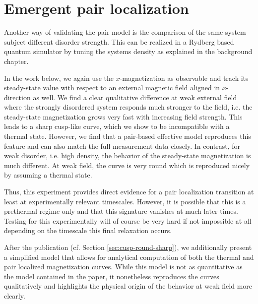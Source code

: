 

\section{Emergent pair localization}
Another way of validating the pair model is the comparison of the same system subject different disorder strength. This can be realized in a Rydberg based quantum simulator by tuning the systems density as explained in the background chapter. %

In the work below, we again use the $x$-magnetization as observable and track its steady-state value with respect to an external magnetic field aligned in $x$-direction as well. We find a clear qualitative difference at weak external field where the strongly disordered system responds much stronger to the field, i.e. the steady-state magnetization grows very fast with increasing field strength. This leads to a sharp cusp-like curve, which we show to be incompatible with a thermal state. However, we find that a pair-based effective model reproduces this feature and can also match the full measurement data closely.
In contrast, for weak disorder, i.e. high density, the behavior of the steady-state magnetization is much different. At weak field, the curve is very round which is reproduced nicely by assuming a thermal state.

Thus, this experiment provides direct evidence for a pair localization transition at least at experimentally relevant timescales. However, it is possible that this is a prethermal regime only and that this signature vanishes at much later times. Testing for this experimentally will of course be very hard if not impossible at all depending on the timescale this final relaxation occurs.

After the publication (cf. Section \ref{sec:cusp-round-sharp}), we additionally present a simplified model that allows for analytical computation of both the thermal and pair localized magnetization curves. While this model is not as quantitative as the model contained in the paper, it nonetheless reproduces the curves qualitatively and highlights the physical origin of the behavior at weak field more clearly.



